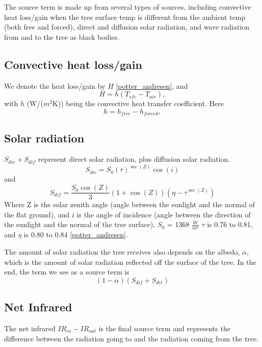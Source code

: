 \documentclass{IEEEtran} %
\begin{document}
The source term is made up from several types of sources, including convective heat loss/gain when the tree surface temp is different from the ambient temp (both free and forced), direct and diffusion solar radiation, and wave radiation from and to the tree as black bodies.  

\subsection{Convective heat loss/gain}
We denote the heat loss/gain by $H$ \ref{potter_andresen}, and 
\begin{equation}
H=h(T_{sfc}-T_{air}),
\end{equation}
with $h$ (W/($m^2$K)) being the convective heat transfer coefficient. Here
\begin{equation}
h=h_{free}-h_{forced},
\end{equation}

\subsection{Solar radiation}
$S_{dir} + S_{dif}$ represent direct solar radiation, plus diffusion solar radiation.
\begin{equation}
S_{dir} = S_0(\tau)^{\sec(Z)}\cos(i)
\end{equation}
and
\begin{equation}
S_{dif} = \frac{S_0\cos(Z)}{3}(1+\cos(Z))(\eta-\tau^{\sec(Z)})
\end{equation}
Where Z is the solar zenith angle (angle between the sunlight and the normal of the flat ground), and $i$ is the angle of incidence (angle between the direction of the sunlight and the normal of the tree surface), $S_0$ = 1368 $\frac{W}{m^2}$ $\tau$ is 0.76 to 0.81, and $\eta$ is 0.80 to 0.84 \ref{potter_andresen}. 

The amount of solar radiation the tree receives also depends on the albedo, $\alpha$, which is the amount of solar radiation reflected off the surface of the tree. 
In the end, the term we see as a source term is
\begin{equation}
(1-\alpha)(S_{dif}+S_{dir})
\end{equation}


\subsection{Net Infrared}
The net infrared $IR_{in}-IR_{out}$ is the final source term and represents the difference between the radiation going to and the radiation coming from the tree.  
\end{document}
